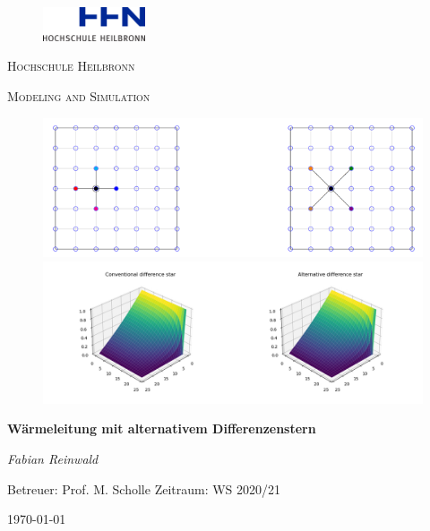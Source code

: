 \documentclass[twoside,10pt,a4paper]{article}
\numberwithin{equation}{section}					%
\numberwithin{figure}{section}						%
\begin{document}
\selectfont
\begin{titlepage}			%
\begin{figure}[h]
    \flushright
    \includegraphics[height=1cm]{bilder/hhn.png}
\end{figure}
	\centering
	{\scshape\LARGE Hochschule Heilbronn\par}
	{\scshape \LARGE Modeling and Simulation\par}
	\vspace{0.5cm}
    \begin{figure}[h]
        \centering
        \includegraphics[width=\textwidth]{bilder/Picture1.png}
        \includegraphics[width=\textwidth]{bilder/convalt.jpg}
    \end{figure}
	{\huge\bfseries Wärmeleitung mit alternativem Differenzenstern\par}
	\vspace{0.5cm}
	{\Large\itshape Fabian Reinwald\par}		%
	\vspace{0.5cm}
	{\large  Betreuer: Prof. M. Scholle \hfill Zeitraum: WS 2020/21\par}		%
	\vspace{0.5cm}
	{\large \today\par}
\end{titlepage}
\end{document}
